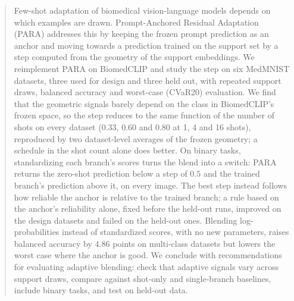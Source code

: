 \begin{abstract}
Few-shot adaptation of biomedical vision-language models depends on which examples are drawn.
Prompt-Anchored Residual Adaptation (PARA) addresses this by keeping the frozen prompt prediction as an anchor
and moving towards a prediction trained on the support set by a step computed from the geometry of the support embeddings.
We reimplement PARA on BiomedCLIP and study the step on six MedMNIST datasets, three used for design and three held out,
with repeated support draws, balanced accuracy and worst-case (CVaR20) evaluation.
We find that the geometric signals barely depend on the class in BiomedCLIP's frozen space,
so the step reduces to the same function of the number of shots on every dataset ($0.33$, $0.60$ and $0.80$ at 1, 4 and 16 shots),
reproduced by two dataset-level averages of the frozen geometry; a schedule in the shot count alone does better.
On binary tasks, standardizing each branch's scores turns the blend into a switch: PARA returns the zero-shot prediction below a step of $0.5$
and the trained branch's prediction above it, on every image.
The best step instead follows how reliable the anchor is relative to the trained branch;
a rule based on the anchor's reliability alone, fixed before the held-out runs, improved on the design datasets and failed on the held-out ones.
Blending log-probabilities instead of standardized scores, with no new parameters, raises balanced accuracy by $4.86$ points on multi-class datasets
but lowers the worst case where the anchor is good.
We conclude with recommendations for evaluating adaptive blending: check that adaptive signals vary across support draws,
compare against shot-only and single-branch baselines, include binary tasks, and test on held-out data.
\end{abstract}
